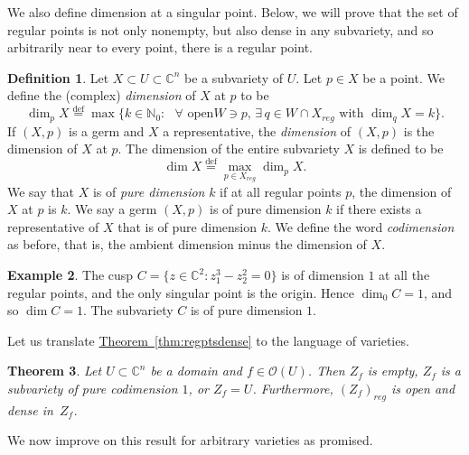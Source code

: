 \documentclass[12pt,openany]{book}
\newcommand{\C}{{\mathbb{C}}}
\newcommand{\N}{{\mathbb{N}}}
\newcommand{\sO}{{\mathscr{O}}}
\newcommand{\myindex}[1]{#1\index{#1}}
\theoremstyle{plain}
\newtheorem{thm}{Theorem}[section]
\theoremstyle{remark}
\theoremstyle{definition}
\newtheorem{defn}[thm]{Definition}
\theoremstyle{exercise}
\theoremstyle{example}
\newtheorem{example}[thm]{Example}
\newcommand{\sectionref}[1]{\hyperref[#1]{section~\ref*{#1}}}
\newcommand{\thmref}[1]{\hyperref[#1]{Theorem~\ref*{#1}}}
\begin{document}
\pagebreak[2]
We also define dimension at a singular point.
Below, we will prove that the set of regular points is not only nonempty,
but also dense in any subvariety, and so arbitrarily near to every point,
there is a regular point.

\begin{defn}
Let $X \subset U \subset \C^n$ be a subvariety of $U$.  Let $p \in
X$ be a point.  We define the (complex)
\emph{\myindex{dimension}} of $X$ at $p$ to be
%
\begin{equation*}
\dim_p X \overset{\text{def}}{=}
\max \bigl\{ k \in \N_0 : \text{ $\forall$ open
$W \ni p$, $\exists \, q \in W \cap X_{\mathit{reg}}$ with $\dim_q X = k$}
\bigr\} .
\end{equation*}
If $(X,p)$ is a germ and $X$ a representative,
the \emph{dimension} of $(X,p)$ is the dimension of
$X$ at $p$.
The dimension of the entire subvariety $X$ is defined to be
%
\begin{equation*}
\dim X \overset{\text{def}}{=}
\max_{p \in X_{\mathit{reg}}} \dim_p X .
\end{equation*}
We say that $X$ is of \emph{\myindex{pure dimension}} $k$ if at
all regular points $p$, the dimension of $X$ at $p$ is $k$.
We say a germ $(X,p)$ is of pure dimension $k$ if there exists a representative
of $X$ that is of pure dimension $k$.
We define the word \emph{codimension} as before, that is, the
ambient dimension minus the dimension of $X$.
\end{defn}

\begin{example}
The cusp $C = \bigl\{ z \in \C^2 : z_1^3-z_2^2 = 0 \bigr\}$ is of
dimension $1$ at all the regular points, and the only singular point is the
origin.  Hence $\dim_0 C = 1$, and so $\dim C = 1$.  The subvariety $C$ is
of pure dimension $1$.
\end{example}

Let us translate
\thmref{thm:regptsdense}
to the language of varieties.

\begin{thm} \label{thm:regptsdense2}
Let $U \subset \C^n$ be a domain and $f \in \sO(U)$.
Then $Z_f$ is empty,
$Z_f$ is a subvariety of pure codimension $1$,
or $Z_f = U$.
Furthermore,
$(Z_f)_{\mathit{reg}}$ is open and dense in~$Z_f$.
\end{thm}

We now improve on this result for arbitrary varieties as promised.
\end{document}
